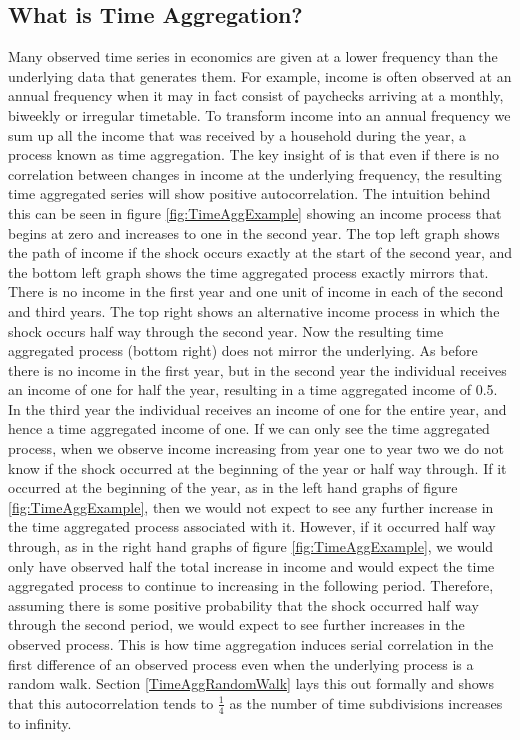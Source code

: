 \subsection{What is Time Aggregation?}
Many observed time series in economics are given at a lower frequency than the underlying data that generates them. For example, income is often observed at an annual frequency when it may in fact consist of paychecks arriving at a monthly, biweekly or irregular timetable. To transform income into an annual frequency we sum up all the income that was received by a household during the year, a process known as time aggregation. The key insight of \cite{working_note_1960} is that even if there is no correlation between changes in income at the underlying frequency, the resulting time aggregated series will show positive autocorrelation. The intuition behind this can be seen in figure \ref{fig:TimeAggExample} showing an income process that begins at zero and increases to one in the second year. The top left graph shows the path of income if the shock occurs exactly at the start of the second year, and the bottom left graph shows the time aggregated process exactly mirrors that. There is no income in the first year and one unit of income in each of the second and third years. The top right shows an alternative income process in which the shock occurs half way through the second year. Now the resulting time aggregated process (bottom right) does not mirror the underlying. As before there is no income in the first year, but in the second year the individual receives an income of one for half the year, resulting in a time aggregated income of 0.5. In the third year the individual receives an income of one for the entire year, and hence a time aggregated income of one. If we can only see the time aggregated process, when we observe income increasing from year one to year two we do not know if the shock occurred at the beginning of the year or half way through. If it occurred at the beginning of the year, as in the left hand graphs of figure \ref{fig:TimeAggExample}, then we would not expect to see any further increase in the time aggregated process associated with it. However, if it occurred half way through, as in the right hand graphs of figure \ref{fig:TimeAggExample}, we would only have observed half the total increase in income and would expect the time aggregated process to continue to increasing in the following period. Therefore, assuming there is some positive probability that the shock occurred half way through the second period, we would expect to see further increases in the observed process. This is how time aggregation induces serial correlation in the first difference of an observed process even when the underlying process is a random walk. Section \ref{TimeAggRandomWalk} lays this out formally and shows that this autocorrelation tends to $\frac{1}{4}$ as the number of time subdivisions increases to infinity.
